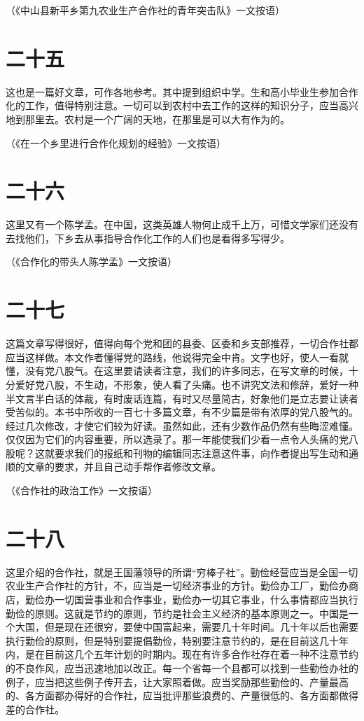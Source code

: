 （《中山县新平乡第九农业生产合作社的青年突击队》一文按语）

\section*{二十五}

这也是一篇好文章，可作各地参考。其中提到组织中学。生和高小毕业生参加合作化的工作，值得特别注意。一切可以到农村中去工作的这样的知识分子，应当高兴地到那里去。农村是一个广阔的天地，在那里是可以大有作为的。


（《在一个乡里进行合作化规划的经验》一文按语）

\section*{二十六}

这里又有一个陈学孟。在中国，这类英雄人物何止成千上万，可惜文学家们还没有去找他们，下乡去从事指导合作化工作的人们也是看得多写得少。


（《合作化的带头人陈学孟》一文按语）

\section*{二十七}

这篇文章写得很好，值得向每个党和团的县委、区委和乡支部推荐，一切合作社都应当这样做。本文作者懂得党的路线，他说得完全中肯。文字也好，使人一看就懂，没有党八股气。在这里要请读者注意，我们的许多同志，在写文章的时候，十分爱好党八股，不生动，不形象，使人看了头痛。也不讲究文法和修辞，爱好一种半文言半白话的体裁，有时废话连篇，有时又尽量简古，好象他们是立志要让读者受苦似的。本书中所收的一百七十多篇文章，有不少篇是带有浓厚的党八股气的。经过几次修改，才使它们较为好读。虽然如此，还有少数作品仍然有些晦涩难懂。仅仅因为它们的内容重要，所以选录了。那一年能使我们少看一点令人头痛的党八股呢？这就要求我们的报纸和刊物的编辑同志注意这件事，向作者提出写生动和通顺的文章的要求，并且自己动手帮作者修改文章。


（《合作社的政治工作》一文按语）

\section*{二十八}

这里介绍的合作社，就是王国藩领导的所谓“穷棒子社”。勤俭经营应当是全国一切农业生产合作社的方针，不，应当是一切经济事业的方针。勤俭办工厂，勤俭办商店，勤俭办一切国营事业和合作事业，勤俭办一切其它事业，什么事情都应当执行勤俭的原则。这就是节约的原则，节约是社会主义经济的基本原则之一。中国是一个大国，但是现在还很穷，要使中国富起来，需要几十年时间。几十年以后也需要执行勤俭的原则，但是特别要提倡勤俭，特别要注意节约的，是在目前这几十年内，是在目前这几个五年计划的时期内。现在有许多合作社存在着一种不注意节约的不良作风，应当迅速地加以改正。每一个省每一个县都可以找到一些勤俭办社的例子，应当把这些例子传开去，让大家照着做。应当奖励那些勤俭的、产量最高的、各方面都办得好的合作社，应当批评那些浪费的、产量很低的、各方面都做得差的合作社。


